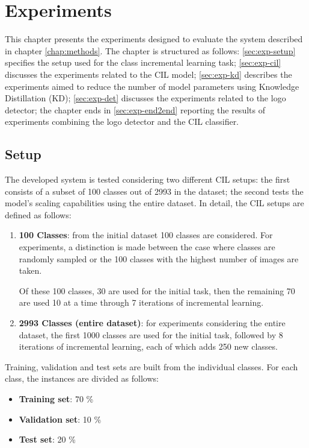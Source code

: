 \chapter{Experiments}
\label{chap:experiments}
This chapter presents the experiments designed to evaluate the system described in chapter \autoref{chap:methods}.
The chapter is structured as follows:
\autoref{sec:exp-setup} specifies the setup used for the class incremental learning task;
\autoref{sec:exp-cil} discusses the experiments related to the CIL model;
\autoref{sec:exp-kd} describes the experiments aimed to reduce the number of model parameters using Knowledge Distillation (KD);
\autoref{sec:exp-det} discusses the experiments related to the logo detector;
the chapter ends in \autoref{sec:exp-end2end} reporting the results of experiments combining the logo detector and the CIL classifier.

\section{Setup}
\label{sec:exp-setup}
The developed system is tested considering two different CIL setups: the first consists of a subset of 100 classes out of 2993 in the dataset; the second tests the model's scaling capabilities using the entire dataset.
In detail, the CIL setups are defined as follows:
\begin{enumerate}
    \item \textbf{100 Classes}: from the initial dataset 100 classes are considered. 
    For experiments, a distinction is made between the case where classes are randomly sampled or the 100 classes with the highest number of images are taken.
    
    Of these 100 classes, 30 are used for the initial task, then the remaining 70 are used 10 at a time through 7 iterations of incremental learning.

    \item \textbf{2993 Classes (entire dataset)}: for experiments considering the entire dataset, the first 1000 classes are used for the initial task, followed by 8 iterations of incremental learning, each of which adds 250 new classes.
\end{enumerate}

Training, validation and test sets are built from the individual classes. For each class, the instances are divided as follows:
\begin{itemize}
    \item \textbf{Training set}: 70 \%
    \item \textbf{Validation set}: 10 \%
    \item \textbf{Test set}: 20 \%
\end{itemize}


